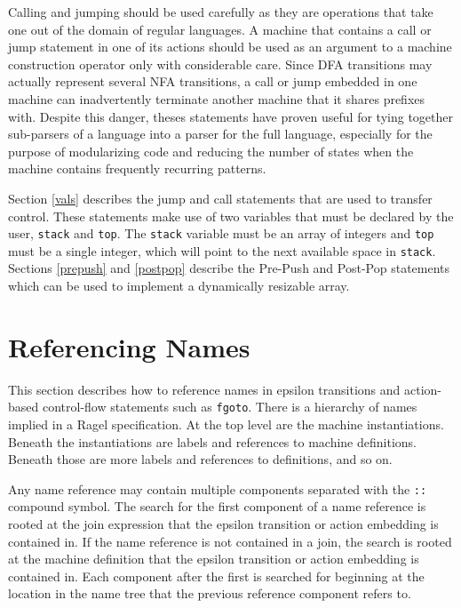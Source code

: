 \documentclass[letterpaper,11pt,oneside]{book}
\begin{document}
Calling and jumping should be used carefully as they are operations that take
one out of the domain of regular languages. A machine that contains a call or
jump statement in one of its actions should be used as an argument to a machine
construction operator only with considerable care. Since DFA transitions may
actually represent several NFA transitions, a call or jump embedded in one
machine can inadvertently terminate another machine that it shares prefixes
with. Despite this danger, theses statements have proven useful for tying
together sub-parsers of a language into a parser for the full language,
especially for the purpose of modularizing code and reducing the number of
states when the machine contains frequently recurring patterns.

Section \ref{vals} describes the jump and call statements that are used to
transfer control. These statements make use of two variables that must be
declared by the user, \verb|stack| and \verb|top|. The \verb|stack| variable
must be an array of integers and \verb|top| must be a single integer, which
will point to the next available space in \verb|stack|. Sections \ref{prepush}
and \ref{postpop} describe the Pre-Push and Post-Pop statements which can be
used to implement a dynamically resizable array.

\section{Referencing Names}
\label{labels}

This section describes how to reference names in epsilon transitions and
action-based control-flow statements such as \verb|fgoto|. There is a hierarchy
of names implied in a Ragel specification.  At the top level are the machine
instantiations. Beneath the instantiations are labels and references to machine
definitions. Beneath those are more labels and references to definitions, and
so on.

Any name reference may contain multiple components separated with the \verb|::|
compound symbol.  The search for the first component of a name reference is
rooted at the join expression that the epsilon transition or action embedding
is contained in. If the name reference is not contained in a join,
the search is rooted at the machine definition that the epsilon transition or
action embedding is contained in. Each component after the first is searched
for beginning at the location in the name tree that the previous reference
component refers to.
\end{document}

